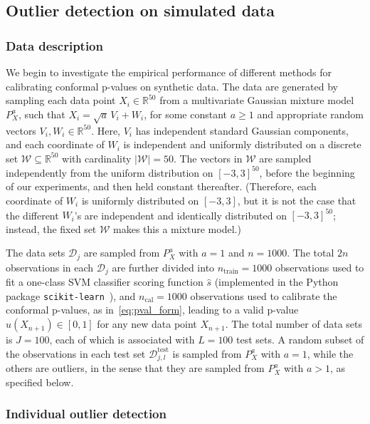 \subsection{Outlier detection on simulated data} \label{sec:exp_simulated}

\subsubsection{Data description}

We begin to investigate the empirical performance of different methods for calibrating conformal p-values on synthetic data.
The data are generated by sampling each data point $X_i \in \mathbb{R}^{50}$ from a multivariate Gaussian mixture model $P_X^{a}$, such that $X_i = \sqrt{a} \, V_i + W_i$, for some constant $a\geq 1$ and appropriate random vectors $V_i,W_i \in \mathbb{R}^{50}$.
Here, $V_i$ has independent standard Gaussian components, and each coordinate of $W_i$ is independent and uniformly distributed on a discrete set $\mathcal{W} \subseteq \mathbb{R}^{50}$ with cardinality $|\mathcal{W}|=50$.
The vectors in $\mathcal{W}$ are sampled independently from the uniform distribution on $[-3,3]^{50}$, before the beginning of our experiments, and then held constant thereafter. (Therefore, each coordinate of $W_i$ is uniformly distributed on $[-3,3]$, but it is not the case that the different $W_i$'s are independent and identically distributed on $[-3,3]^{50}$; instead, the fixed set $\mathcal{W}$ makes this a mixture model.)

The data sets $\mathcal{D}_j$ are sampled from $P_X^{a}$ with $a=1$ and $n=1000$.
The total $2n$ observations in each $\mathcal{D}_j$ are further divided into $n_{\text{train}}=1000$ observations used to fit a one-class SVM classifier scoring function $\hat{s}$ (implemented in the Python package \texttt{scikit-learn}~\cite{scikit-learn}), and $n_{\text{cal}}=1000$ observations used to calibrate the conformal p-values, as in~\eqref{eq:pval_form}, leading to a valid p-value $\hat{u}(X_{n+1}) \in [0,1]$ for any new data point $X_{n+1}$.
The total number of data sets is $J=100$, each of which is associated with $L=100$ test sets.
A random subset of the observations in each test set $\mathcal{D}^{\mathrm{test}}_{j,l}$ is sampled from $P_X^{a}$ with $a=1$, while the others are outliers, in the sense that they are sampled from $P_X^{a}$ with $a>1$, as specified below.

\subsubsection{Individual outlier detection}
\label{sec:simulated_individual_outlier_detection}

